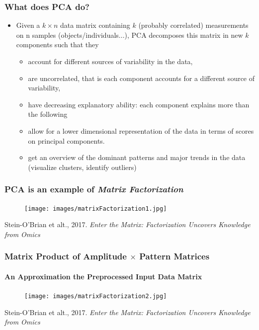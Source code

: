\documentclass{beamer}
\begin{document}
\begin{frame}
	\frametitle{What does PCA do? }
	\begin{itemize}
		\item Given a $k\times n$ data matrix containing $k$ (probably correlated) measurements on n samples (objects/individuals...), PCA decomposes this matrix in new $k$ components such that they
		\begin{itemize}
			\item account for different sources of variability in the data,
			\item are uncorrelated, that is each component accounts for a different source of variability,
			\item have decreasing explanatory ability: each component explains more than the following
			\item allow for a lower dimensional representation of the data in terms of scores on principal components.
			\item get an overview of the dominant patterns and major trends in the data (visualize clusters, identify outliers)
		\end{itemize}
	\end{itemize}
\end{frame}


\begin{frame}
	\frametitle{PCA is an example of \textit{Matrix Factorization}}
\vspace{-0.25 cm}
\begin{figure}[ht]
	\centering
	\texttt{[image: images/matrixFactorization1.jpg]}
\end{figure} 
\vspace{-0.5cm}   	{\tiny Stein-O'Brian et alt., 2017. \textit{Enter the Matrix: Factorization Uncovers Knowledge from Omics
}}
\end{frame}

\begin{frame}
	\frametitle{Matrix Product of Amplitude $\times$ Pattern Matrices} \framesubtitle{An Approximation the Preprocessed Input Data Matrix  }
	\vspace{-0.25 cm}
	\begin{figure}[ht]
		\centering
		\texttt{[image: images/matrixFactorization2.jpg]}
	\end{figure} 
	\vspace{-0.5cm}   	{\tiny Stein-O'Brian et alt., 2017. \textit{Enter the Matrix: Factorization Uncovers Knowledge from Omics
	}}
\end{frame}
\end{document}
